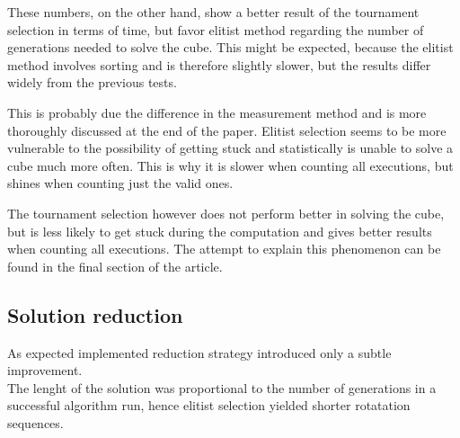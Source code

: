 \documentclass[a4paper]{article}
\begin{document}
These numbers, on the other hand, show a better result of the tournament selection in terms of time, but favor elitist method regarding the number of generations needed to solve the cube. This might be expected, because the elitist method involves sorting and is therefore slightly slower, but the results differ widely from the previous tests.

This is probably due the difference in the measurement method and is more thoroughly discussed at the end of the paper. Elitist selection seems to be more vulnerable to the possibility of getting stuck and statistically is unable to solve a cube much more often. This is why it is slower when counting all executions, but shines when counting just the valid ones.

The tournament selection however does not perform better in solving the cube, but is less likely to get stuck during the computation and gives better results when counting all executions. The attempt to explain this phenomenon can be found in the final section of the article.

\subsection{Solution reduction}

As expected implemented reduction strategy introduced only a subtle improvement.\\
The lenght of the solution was proportional to the number of generations in a successful algorithm run,
hence elitist selection yielded shorter rotatation sequences.

\begin{table}[h]
\centering
\caption{Elitist selection}
\label{table:red_elitist_tests}
\end{table}
\end{document}
